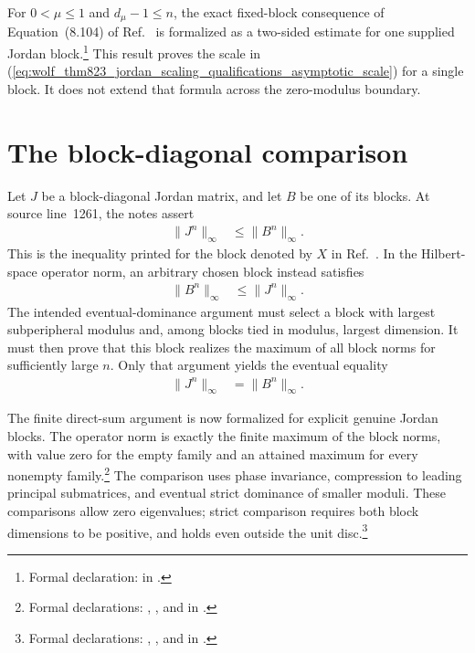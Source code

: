 \documentclass{article}
\begin{document}
For $0<\mu\leq 1$ and $d_\mu-1\leq n$, the exact fixed-block consequence of
Equation~(8.104) of Ref.~\cite{Wolf2012Quantum} is formalized as a two-sided
estimate for one supplied Jordan block.\footnote{Formal declaration:
 in
.}
This result proves the scale in
(\ref{eq:wolf_thm823_jordan_scaling_qualifications_asymptotic_scale}) for a
single block. It does not extend that formula across the zero-modulus
boundary.

\section{The block-diagonal comparison}

Let $J$ be a block-diagonal Jordan matrix, and let $B$ be one of its blocks.
At source line~1261, the notes assert
\begin{align}
    \lVert J^n\rVert_\infty
        &\leq \lVert B^n\rVert_\infty.
    \label{eq:wolf_thm823_jordan_scaling_qualifications_printed_block_bound}
\end{align}
This is the inequality printed for the block denoted by $X$ in
Ref.~\cite{Wolf2012Quantum}. In the Hilbert-space operator norm, an arbitrary
chosen block instead satisfies
\begin{align}
    \lVert B^n\rVert_\infty
        &\leq \lVert J^n\rVert_\infty.
    \label{eq:wolf_thm823_jordan_scaling_qualifications_valid_block_bound}
\end{align}
The intended eventual-dominance argument must select a block with largest
subperipheral modulus and, among blocks tied in modulus, largest dimension. It
must then prove that this block realizes the maximum of all block norms for
sufficiently large $n$. Only that argument yields the eventual equality
\begin{align}
    \lVert J^n\rVert_\infty
        &= \lVert B^n\rVert_\infty.
    \label{eq:wolf_thm823_jordan_scaling_qualifications_eventual_block_equality}
\end{align}

The finite direct-sum argument is now formalized for explicit genuine
Jordan blocks. The operator norm is exactly the finite maximum of the block
norms, with value zero for the empty family and an attained maximum for every
nonempty family.\footnote{Formal declarations:
,
, and
 in
.}
The comparison uses phase invariance, compression to leading principal
submatrices, and eventual strict dominance of smaller moduli. These
comparisons allow zero eigenvalues; strict comparison requires both block
dimensions to be positive, and holds even outside the unit disc.\footnote{Formal
declarations:
,
, and
 in
.}
\end{document}
